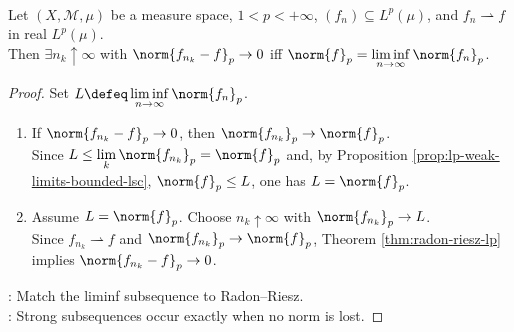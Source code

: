 \begin{corollary} \label{cor:radon-riesz-strong-subsequence-criterion} \\
Let $(X,\mathcal M,\mu)$ be a measure space, $1<p<+\infty$, $(f_n)\subseteq L^p(\mu)$, and $f_n\rightharpoonup f$ in real $L^p(\mu)$.\\
Then $\exists n_k\uparrow\infty$ with $\norm{f_{n_k}-f}_p\to0$ iff $\norm{f}_p=\liminf\limits_{n\to\infty}\norm{f_n}_p$.
\begin{proof}
Set $L\defeq\liminf\limits_{n\to\infty}\norm{f_n}_p$.
\begin{enumerate}[label=\roman*.]
\setlength{\itemsep}{0pt}
\item[$(\Rightarrow)$] If $\norm{f_{n_k}-f}_p\to0$, then $\norm{f_{n_k}}_p\to\norm{f}_p$.\\
Since $L\leq\lim\limits_k\norm{f_{n_k}}_p=\norm{f}_p$ and, by Proposition \ref{prop:lp-weak-limits-bounded-lsc}, $\norm{f}_p\leq L$, one has $L=\norm{f}_p$.
\item[$(\Leftarrow)$] Assume $L=\norm{f}_p$. Choose $n_k\uparrow\infty$ with $\norm{f_{n_k}}_p\to L$.\\
Since $f_{n_k}\rightharpoonup f$ and $\norm{f_{n_k}}_p\to\norm{f}_p$, Theorem \ref{thm:radon-riesz-lp} implies $\norm{f_{n_k}-f}_p\to0$.
\end{enumerate}
: Match the liminf subsequence to Radon--Riesz.\\
: Strong subsequences occur exactly when no norm is lost.
\end{proof}
\end{corollary}

